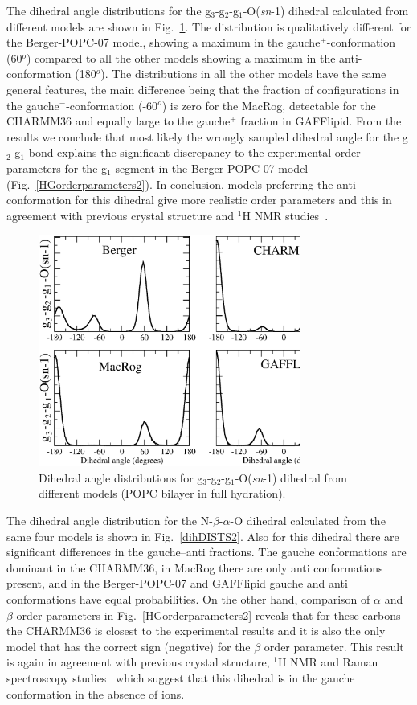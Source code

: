 \documentclass[pre,aps,floatfix,authordate1-4,twocolumn]{revtex4-1}
\begin{document}
The dihedral angle distributions for the  g$_3$-g$_2$-g$_1$-O(\textit{sn}-1) dihedral calculated from different models are
shown in Fig.~\ref{dihDISTS}. The distribution is qualitatively different for the Berger-POPC-07 model, showing a maximum in 
the gauche$^+$-conformation (60$^o$) compared to all the other models showing a maximum in the anti-conformation (180$^o$).
The distributions in all the other models have the same general features, the main difference being that the
fraction of configurations in the gauche$^-$-conformation (-60$^o$) is zero for the MacRog, detectable for the CHARMM36 and
equally large to the gauche$^+$ fraction in GAFFlipid. From the results we conclude that most likely the wrongly sampled
dihedral angle for the g$_2$-g$_1$ bond explains the significant discrepancy to the experimental order parameters
for the g$_1$ segment in the Berger-POPC-07 model (Fig.~\ref{HGorderparameters2}). 
In conclusion, models preferring the anti conformation for this dihedral give more realistic order parameters and
this in agreement with previous crystal structure and $^1$H NMR studies~\cite{hauser80,hauser81,hauser81b,hauser88,pascher92,marsh06}.
\begin{figure}[]
  \centering
  \includegraphics[width=8.6cm]{g1-g2_Cdihs2.eps}
  \caption{\label{dihDISTS}
    Dihedral angle distributions for g$_3$-g$_2$-g$_1$-O(\textit{sn}-1) dihedral from different models (POPC bilayer in full hydration).
      } 
\end{figure}

The dihedral angle distribution for the  N-$\beta$-$\alpha$-O dihedral calculated from the same four models is 
shown in Fig.~\ref{dihDISTS2}. Also for this dihedral there are significant differences in the gauche--anti fractions.
The gauche conformations are dominant in the CHARMM36, in MacRog there are only anti conformations present,
and in the Berger-POPC-07 and GAFFlipid gauche and anti conformations have equal probabilities. 
On the other hand, comparison of $\alpha$ and $\beta$ order parameters in Fig.~\ref{HGorderparameters2}
reveals that for these carbons the CHARMM36 is closest to the experimental results and it is also the only model that has the correct
sign (negative) for the $\beta$ order parameter. This result is again in agreement with previous 
crystal structure, $^1$H NMR and Raman spectroscopy studies~\cite{hauser80,hauser81,hauser81b,akutsu81b} which suggest that
this dihedral is in the gauche conformation in the absence of ions.
\end{document}
